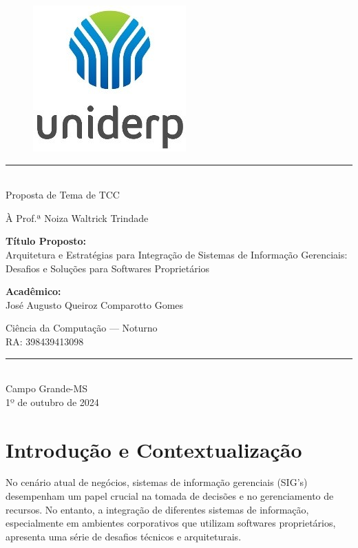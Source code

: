 \documentclass[12pt, a4paper, onecolumn]{exam}
\author{\authorfullname}
\title{\subject}
\newcommand{\subject}{Proposta de Tema de TCC}
\newcommand{\authorfullname}{José Augusto Queiroz Comparotto Gomes}
\newcommand{\authorno}{398439413098}
\newcommand{\professor}{Prof.ª Noiza Waltrick Trindade}
\newcommand{\course}{Ciência da Computação — Noturno}
\newcommand{\location}{Campo Grande-MS}
\newcommand{\documentdate}{1º de outubro de 2024}
\begin{document}
\begingroup  

    \centering
    \begin{figure}
        \centering
        \includegraphics[width=0.15\linewidth]{assets/uniderp.jpg}
        \label{fig:university-logo}
    \end{figure}
    
    \rule{\textwidth}{2pt}  \\[1em]
    
    \LARGE \subject     \\
    
    \vfill
    
    \large À \professor \\

    \vfill
    
    \large \textbf{Título Proposto:} \\[1em]
    \LARGE Arquitetura e Estratégias para Integração de Sistemas de Informação Gerenciais: Desafios e Soluções para Softwares Proprietários
    
    \vfill

    \large \textbf{Acadêmico:} \\[1em]
    \LARGE \authorfullname
    
    \vfill
    
    \large \course          \\
    \large RA: \authorno    \\[1em]
    
    \rule{\textwidth}{2pt}  \\[1em]

    \large \location        \\
    \large \documentdate    \\

    \pagebreak
\endgroup

\section{Introdução e Contextualização}

No cenário atual de negócios, sistemas de informação gerenciais (SIG's) desempenham um papel crucial na tomada de decisões e no gerenciamento de recursos. No entanto, a integração de diferentes sistemas de informação, especialmente em ambientes corporativos que utilizam softwares proprietários, apresenta uma série de desafios técnicos e arquiteturais.
\end{document}
